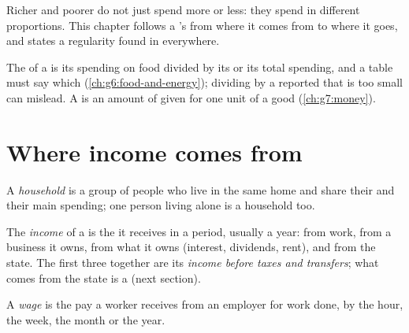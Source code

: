 Richer and poorer  do not just spend more or less: they spend in different
proportions. This chapter follows a 's  from where it comes from to where it
goes, and states a regularity found in   everywhere.

\begin{recall}
The  of a  is its spending on food divided by its  or its total
spending, and a table must say which (\cref{ch:g6:food-and-energy}); dividing by a reported
 that is too small can mislead. A  is an amount of  given for one unit of a
good (\cref{ch:g7:money}).
\end{recall}

\section{Where income comes from}

\begin{definition}[Household]\label{def:g7:households:household}
A \emph{household} is a group of people who live in the same home and share
their  and their main spending; one person living alone is a household too.
\end{definition}

\begin{definition}[Income]\label{def:g7:households:income}
The \emph{income} of a  is the  it receives in a period, usually a
year: from work, from a business it owns, from what it owns (interest, dividends, rent), and
from the state. The first three together are its \emph{income before taxes and
transfers}; what comes from the state is a 
(next section).
\end{definition}

\begin{definition}[Wage]\label{def:g7:households:wage}
A \emph{wage} is the pay a worker receives from an employer for work done, by the
hour, the week, the month or the year.
\end{definition}

